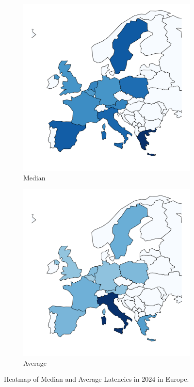 \begin{figure}
	\centering
	\begin{subfigure}[t]{0.47\linewidth}
		\includegraphics[width=\linewidth]{chapters/4-results/latency/img/heatmap-median-latencies-2024.pdf}
		\caption{Median}
	\end{subfigure}
	\begin{subfigure}[t]{0.47\linewidth}
		\includegraphics[width=\linewidth]{chapters/4-results/latency/img/heatmap-average-latencies-2024.pdf}
		\caption{Average}
	\end{subfigure}
	\caption{Heatmap of Median and Average Latencies in 2024 in Europe.}
	\label{fig:heatmap-latencies-europe}
\end{figure}

